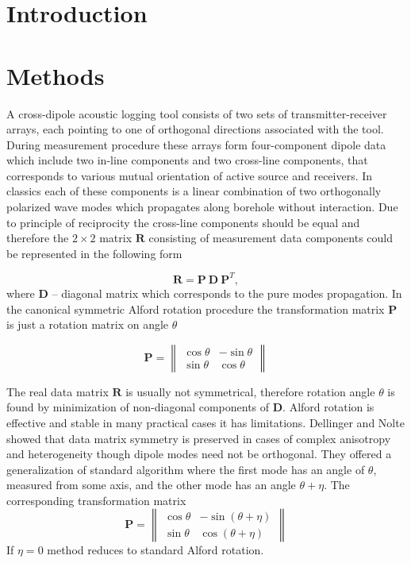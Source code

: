 \documentclass[a4paper,11pt]{article}
\begin{document}
\section{Introduction}

\section{Methods}
A cross-dipole acoustic logging tool consists of two sets of transmitter-receiver arrays, each pointing to one of orthogonal directions associated with the tool. During measurement procedure these arrays form four-component dipole data which include two in-line components and two cross-line components, that corresponds to various mutual orientation of active source and receivers. In classics each of these components is a linear combination of two orthogonally polarized wave modes which propagates along borehole without interaction. Due to principle of reciprocity the cross-line components should be equal and therefore the $2\times 2$ matrix $\mathbf{R}$ consisting of measurement data components could be represented in the following form

\begin{equation}
\mathbf{R} = \mathbf{P} \ \mathbf{D} \ \mathbf{P}^T, \label{eq:alford_symmetric} 
\end{equation}
where $\mathbf{D}$ -- diagonal matrix which corresponds to the pure modes propagation. In the canonical symmetric Alford rotation \cite{Alford1986} procedure the transformation matrix $\mathbf{P}$ is just a rotation matrix on angle $\theta$

\begin{equation*}
\mathbf{P} = \left\|
\begin{array}{cc}
\cos \theta &-\sin \theta \\ 
\sin \theta & \cos \theta
\end{array} 
\right\| 
\end{equation*}

The real data matrix $\mathbf{R}$ is usually not symmetrical, therefore rotation angle $\theta$ is found by minimization of non-diagonal components of $\mathbf{D}$. Alford rotation is effective and stable in many practical cases it has limitations. Dellinger and Nolte \cite{Dellinger1997} showed that data matrix symmetry is preserved in cases of complex anisotropy and heterogeneity though dipole modes need not be orthogonal. They offered a generalization of standard algorithm where the first mode has an angle of $\theta$, measured from some axis, and the other mode has an angle $\theta+\eta$. The corresponding transformation matrix \cite{Dellinger1998}
\begin{equation*}
\mathbf{P} = \left\|
\begin{array}{cc}
\cos \theta & -\sin (\theta+\eta) \\ 
\sin \theta & \cos (\theta+\eta)
\end{array} 
\right\|
\end{equation*}
If $\eta=0$ method reduces to standard Alford rotation.
\end{document}
